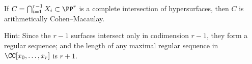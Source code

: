 \begin{exercise}\label{ci is acm}
If $C=\bigcap_{i = 1}^{r-1}X_i \subset \PP^r$ is a 
%
complete intersection
 of hypersurfaces,
then $C$ is 
arithmetically Cohen--Macaulay.

Hint: Since the $r-1$ surfaces intersect only in codimension $r-1$, they form
a regular sequence; and the length of any maximal regular sequence in 
$\CC[x_0,\dots, x_r]$ is $r+1$. 
\end{exercise}





